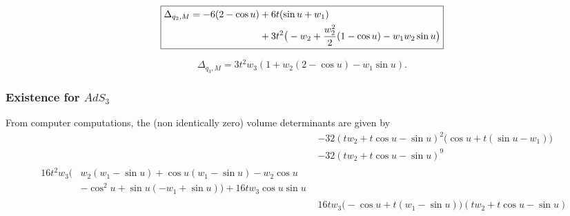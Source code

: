 \begin{equation}
\boxed{%
\begin{aligned}
\Delta_{q_2,M}=-6(2-\cos u)&+6t(\sin u+w_1)\\&+3t^2\big(
-w_2+\frac{w_2^2}{2}(1-\cos u)-w_1w_2\sin u
\big)
\end{aligned}
}
\end{equation}

\begin{equation}
\boxed
{
  \Delta_{q_3,M}=3t^2w_3(1+w_2(2-\cos u)-w_1\sin u).
}
\end{equation}

\subsubsection{Existence for \texorpdfstring{$AdS_3$}{AdS3}}

From computer computations, the (non identically zero) volume determinants are given by
\begin{subequations}
\begin{align}
  &-32(tw_2+t\cos u-\sin u)^2\big(\cos u+t(\sin u-w_1)\big)\\
  &-32(tw_2+t\cos u-\sin u)^9\\
\begin{split}
16t^2w_3\Big(&w_2(w_1-\sin u)+\cos u(w_1-\sin u)-w_2\cos u\\
	&-\cos^2u+\sin u(-w_1+\sin u)
\Big)+16tw_3\cos u\sin u
\end{split}\\
&16tw_3
\big(
 -\cos u+t(w_1-\sin u)
\big)
(tw_2+t\cos u-\sin u)
\end{align}
\end{subequations}


